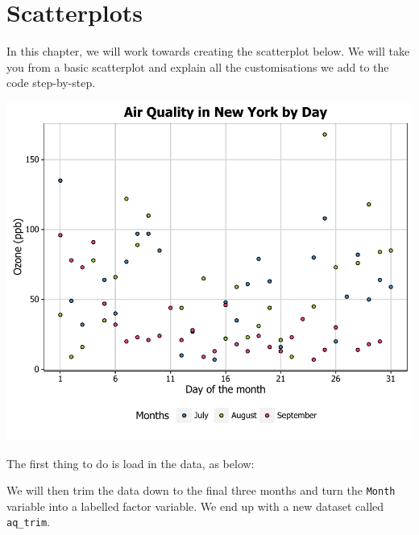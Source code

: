 \chapter{Scatterplots}

In this chapter, we will work towards creating the scatterplot below.
We will take you from a basic scatterplot and explain all the
customisations we add to the code step-by-step.

\begin{center}\includegraphics[width=0.6\linewidth]{5_Scatter_Plots_pdf/scatter_finalgraph-1} \end{center}

The first thing to do is load in the data, as below:

\begin{Shaded}
\begin{Highlighting}[]

\end{Highlighting}
\end{Shaded}

We will then trim the data down to the final three months and turn the
\texttt{Month} variable into a labelled factor variable. We end up with
a new dataset called \texttt{aq\_trim}.

\begin{Shaded}
\begin{Highlighting}[]
\StringTok{ }\NormalTok{airquality[}\StringTok{ } \NormalTok{|}
\StringTok{ } \NormalTok{|}
\StringTok{ }\NormalTok{), ]}
\StringTok{ }
 \NormalTok{(}\NormalTok{, }\NormalTok{, }\NormalTok{))}
\end{Highlighting}
\end{Shaded}

